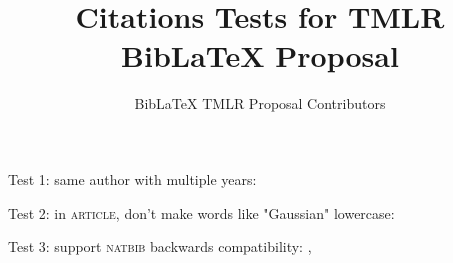 \documentclass[12pt]{article}
\title{Citations Tests for TMLR BibLaTeX Proposal}
\author{BibLaTeX TMLR Proposal Contributors}
\begin{document}
\maketitle

Test 1: same author with multiple years: \cite{wilson20,wilson21}

Test 2: in \textsc{article}, don't make words like "Gaussian" lowercase: 

Test 3: support \textsc{natbib} backwards compatibility: \citet{wilson20}, \citep{wilson20}

\printbibliography
\end{document}
